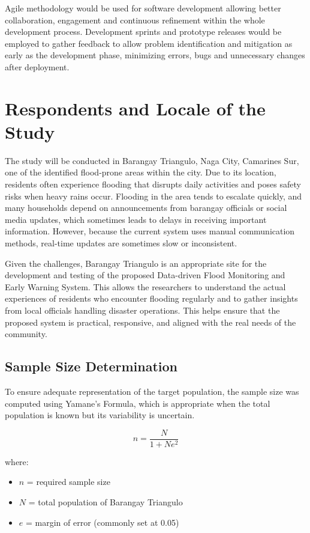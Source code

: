 \documentclass{research}
\begin{document}
Agile methodology would be used for software development allowing better collaboration, engagement and continuous refinement within the whole development process. Development sprints and prototype releases would be employed to gather feedback to allow problem identification and mitigation as early as the development phase, minimizing errors, bugs and unnecessary changes after deployment.

\section{Respondents and Locale of the Study}

The study will be conducted in Barangay Triangulo, Naga City, Camarines Sur, one of the identified flood-prone areas within the city. Due to its location, residents often experience flooding that disrupts daily activities and poses safety risks when heavy rains occur. Flooding in the area tends to escalate quickly, and many households depend on announcements from barangay officials or social media updates, which sometimes leads to delays in receiving important information. However, because the current system uses manual communication methods, real-time updates are sometimes slow or inconsistent.

Given the challenges, Barangay Triangulo is an appropriate site for the development and testing of the proposed Data-driven Flood Monitoring and Early Warning System. This allows the researchers to understand the actual experiences of residents who encounter flooding regularly and to gather insights from local officials handling disaster operations. This helps ensure that the proposed system is practical, responsive, and aligned with the real needs of the community.

\subsection*{Sample Size Determination}

To ensure adequate representation of the target population, the sample size was computed using Yamane's Formula, which is appropriate when the total population is known but its variability is uncertain.

\begin{equation}
    n = \frac{N}{1 + Ne^{2}}
\end{equation}

\noindent where:
\begin{itemize}
    \item $n$ = required sample size
    \item $N$ = total population of Barangay Triangulo
    \item $e$ = margin of error (commonly set at 0.05)
\end{itemize}
\end{document}
